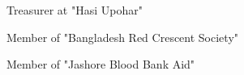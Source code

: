 \begin{zitemize}
\item Treasurer at "Hasi Upohar"
\item Member of "Bangladesh Red Crescent Society"
\item Member of "Jashore Blood Bank Aid"
\end{zitemize}